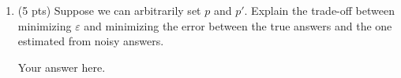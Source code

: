 \documentclass[11pt,letterpaper]{article}
\newenvironment{answer}{\em \color{blue} \begin{adjustwidth}{1cm}{1cm}}{\end{adjustwidth}}
\begin{document}
\begin{enumerate}
	\medskip
%

	\medskip
	Prove that this general variant satisfies $\varepsilon$-(local) differential privacy~(\cref{def:localdp}). Give an expression for $\varepsilon$ in terms of $p$ and $p'$.
	
	\begin{answer}
	
		Your answer here.
		
	\end{answer}
	
	\item (5 pts) Suppose we can arbitrarily set $p$ and $p'$. Explain the trade-off between minimizing $\varepsilon$ and minimizing the error between the true answers and the one estimated from noisy answers.
	
	\begin{answer}
	
		Your answer here.
		
	\end{answer}
%
\end{enumerate}


\newpage
\end{document}
